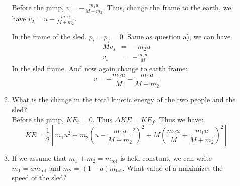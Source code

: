 \documentclass{article}
\begin{document}
\begin{enumerate}
\begin{enumerate}
        Before the jump, $v = - \frac{m_1 u}{M + m_2}$. Thus, change the frame to the earth, we have $v_2 = u - \frac{m_1 u}{M + m_2}$.

        In the frame of the sled. $p_i = p_f = 0$. Same as question a), we can have
        \begin{eqnarray*}
        M v_s &=& - m_2 u \\ 
        v_s &=& -\frac{m_2 u}{M }
        \end{eqnarray*}
        In the sled frame. And now again change to earth frame:
        \[
        v = -\frac{m_2 u}{M} - \frac{m_1 u}{M + m_2}
        \]
        \item What is the change in the total kinetic energy of the two people and the sled?\\

        Before the jump, $KE_i = 0$. Thus $\Delta KE = KE_f$. Thus we have:
        \[
        KE = \frac{1}{2}\left[m_1u^2 + m_2 \left(u - \frac{m_1 u}{M + m_2}^2\right)^2 + M\left(\frac{m_2 u}{M} + \frac{m_1 u}{M + m_2}\right)^2\right]
        \]
        \item If we assume that $m_1 + m_2 = m_\text{tot}$ is held constant, we can write $m_1 = am_\text{tot}$ and $m_2 = (1 - a)m_\text{tot}$. What value of a maximizes the speed of the sled? \\


\end{enumerate}
\end{enumerate}
\end{document}
